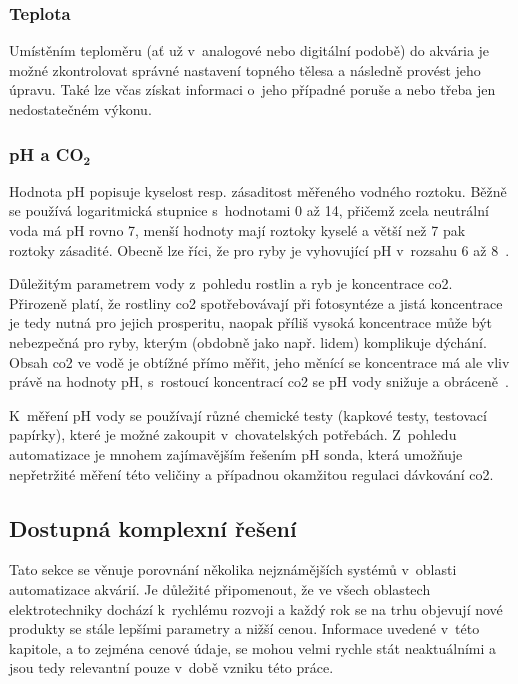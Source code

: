         \subsubsection{Teplota}
            Umístěním teploměru (ať už v~analogové nebo digitální podobě) do akvária je možné zkontrolovat správné nastavení topného tělesa a následně provést jeho úpravu. Také lze včas získat informaci o~jeho případné poruše a nebo třeba jen nedostatečném výkonu. 
        \subsubsection{pH a CO\(\mathbf{_{2}}\)}
            Hodnota pH popisuje kyselost resp. zásaditost měřeného vodného roztoku. Běžně se používá logaritmická stupnice s~hodnotami 0 až 14, přičemž zcela neutrální voda má pH rovno 7, menší hodnoty mají roztoky kyselé a větší než 7 pak roztoky zásadité.  Obecně lze říci, že pro ryby je vyhovující pH v~rozsahu 6 až 8~\cite{slavotinek2014}. 

            Důležitým parametrem vody z~pohledu rostlin a ryb je koncentrace \acs{co2}. Přirozeně platí, že rostliny \acs{co2} spotřebovávají při fotosyntéze a jistá koncentrace je tedy nutná pro jejich prosperitu, naopak příliš vysoká koncentrace může být nebezpečná pro ryby, kterým (obdobně jako např. lidem) komplikuje dýchání. Obsah \acs{co2} ve vodě je obtížné přímo měřit, jeho měnící se koncentrace má ale vliv právě na hodnoty pH, s~rostoucí koncentrací \acs{co2} se pH vody snižuje a obráceně~\cite{DvorakJan2014RPpa,KejzlarRadim2022Ařpa}. 

            K~měření pH vody se používají různé chemické testy (kapkové testy, testovací papírky), které je možné zakoupit v~chovatelských potřebách. Z~pohledu automatizace je mnohem zajímavějším řešením pH sonda, která umožňuje nepřetržité měření této veličiny a případnou okamžitou regulaci dávkování \acs{co2}.

             
    \subsection{Dostupná komplexní řešení}
    \label{lab:kapitola-komplexni-reseni}
        Tato sekce se věnuje porovnání několika nejznámějších systémů v~oblasti automatizace akvárií. Je důležité připomenout, že ve všech oblastech elektrotechniky dochází k~rychlému rozvoji a každý rok se na trhu objevují nové produkty se stále lepšími parametry a nižší cenou. Informace uvedené v~této kapitole, a to zejména cenové údaje, se mohou velmi rychle stát neaktuálními a jsou tedy relevantní pouze v~době vzniku této práce.

